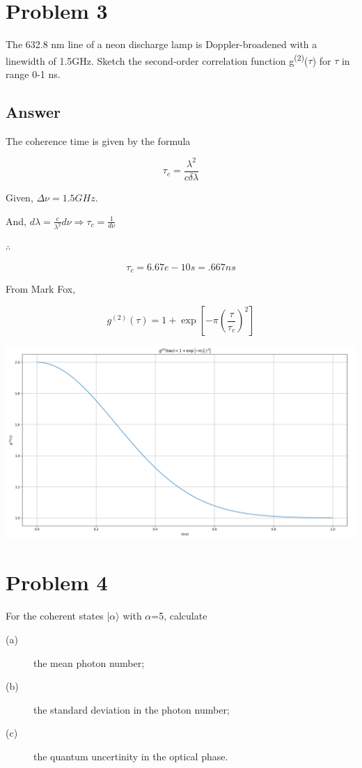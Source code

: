 \documentclass[a4paper,11pt]{article}
\begin{document}
\section*{Problem 3}
\label{sec:org07a6ba4}
The 632.8 nm line of a neon discharge lamp is Doppler-broadened with a linewidth of 1.5GHz. Sketch the second-order correlation function g\textsuperscript{(2)}(\(\tau\)) for \(\tau\) in range 0-1 ns.

\subsection*{Answer}
\label{sec:org61e46ea}
The coherence time is given by the formula

$$\tau_c = \frac{\lambda^2}{c\delta \lambda}$$

Given, \(\Delta \nu = 1.5GHz\).

And, \(d\lambda = \frac{c}{\lambda^2} d\nu \Rightarrow \tau_c = \frac{1}{d\nu}\)

\(\therefore\)

$$\tau_c = 6.67e-10s = .667 ns$$

From Mark Fox,

$$g^{(2)}(\tau) = 1+\exp\left[-\pi\left(\frac{\tau}{\tau_c}\right)^2\right]$$

\begin{center}
\includegraphics[width=.9\linewidth]{pr3_plot.png}
\end{center}



\section*{Problem 4}
\label{sec:org3b46d2f}
For the coherent states |\(\alpha \rangle\)  with \(\alpha\)=5, calculate
\begin{description}
\item[{(a)}] the mean photon number;
\item[{(b)}] the standard deviation in the photon number;
\item[{(c)}] the quantum uncertinity in the optical phase.
\end{description}
\end{document}
